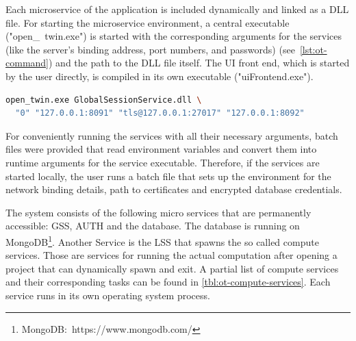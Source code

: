 Each microservice of the application is included dynamically and linked as a \ac{DLL} file. For starting the microservice environment, a central executable ("open\_\ twin.exe") is started with the corresponding arguments for the services (like the server's binding address, port numbers, and passwords) (see~\autoref{lst:ot-command}) and the path to the \ac{DLL} file itself. The UI front end, which is started by the user directly, is compiled in its own executable ("uiFrontend.exe").

\begin{lstlisting}[language=sh, caption={Command line of Open Twin Service start}, label=lst:ot-command]
open_twin.exe GlobalSessionService.dll \
  "0" "127.0.0.1:8091" "tls@127.0.0.1:27017" "127.0.0.1:8092"
\end{lstlisting}

For conveniently running the services with all their necessary arguments, batch files were provided that read environment variables and convert them into runtime arguments for the service executable. Therefore, if the services are started locally, the user runs a batch file that sets up the environment for the network binding details, path to certificates and encrypted database credentials.

The system consists of the following micro services that are permanently accessible: \acf{GSS}, \acf{AUTH} and the database. The database is running on MongoDB\footnote{MongoDB:~https://www.mongodb.com/}. Another Service is the \acf{LSS} that spawns the so called compute services. Those are services for running the actual computation after opening a project that can dynamically spawn and exit. A partial list of compute services and their corresponding tasks can be found in \autoref{tbl:ot-compute-services}.
Each service runs in its own operating system process.

